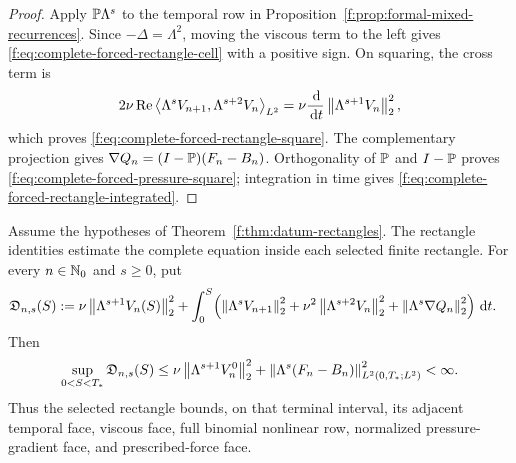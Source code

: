 \begin{proof}
Apply \(\mathbb P\Lambda^s\) to the temporal row in
Proposition~\ref{f:prop:formal-mixed-recurrences}. Since
\(-\Delta=\Lambda^2\), moving the viscous term to the left gives
\eqref{f:eq:complete-forced-rectangle-cell} with a positive sign.
On squaring, the cross term is
\[
 2\nu\operatorname{Re}
 \left\langle \Lambda^sV_{n+1},\Lambda^{s+2}V_n\right\rangle_{L^2}
 =\nu\frac{\,\mathrm d}{\,\mathrm d t}\left\lVert \Lambda^{s+1}V_n\right\rVert_2^2,
\]
which proves \eqref{f:eq:complete-forced-rectangle-square}.  The complementary
projection gives
\(\nabla Q_n=(I-\mathbb P)(F_n-B_n)\).  Orthogonality of \(\mathbb P\) and
\(I-\mathbb P\) proves \eqref{f:eq:complete-forced-pressure-square}; integration in
time gives \eqref{f:eq:complete-forced-rectangle-integrated}.
\end{proof}

\begin{proposition}
\label{f:prop:datum-complete-rectangle-estimates}
Assume the hypotheses of Theorem~\ref{f:thm:datum-rectangles}.  The rectangle
identities estimate the complete equation inside each selected finite rectangle.
For every \(n\in\mathbb N_0\) and \(s\ge0\), put
\begin{align}
 \mathfrak D_{n,s}(S):={}&
 \nu\left\lVert \Lambda^{s+1}V_n(S)\right\rVert_2^2
 +\int_0^S\!\left(
   \left\lVert \Lambda^sV_{n+1}\right\rVert_2^2
   +\nu^2\left\lVert \Lambda^{s+2}V_n\right\rVert_2^2
   +\left\lVert \Lambda^s\nabla Q_n\right\rVert_2^2\right)\,\mathrm d t.
 \label{f:eq:datum-complete-row-record}
\end{align}
Then
\begin{equation}
 \sup_{0<S<T_*}\mathfrak D_{n,s}(S)
 \le
 \nu\left\lVert \Lambda^{s+1}V_n^0\right\rVert_2^2
 +\left\lVert \Lambda^s(F_n-B_n)\right\rVert_{L^2(0,T_*;L^2)}^2
 <\infty.
 \label{f:eq:datum-complete-row-projection-bound}
\end{equation}
Thus the selected rectangle bounds, on that terminal interval, its
adjacent temporal face, viscous face, full binomial nonlinear row, normalized
pressure-gradient face, and prescribed-force face.
\end{proposition}

